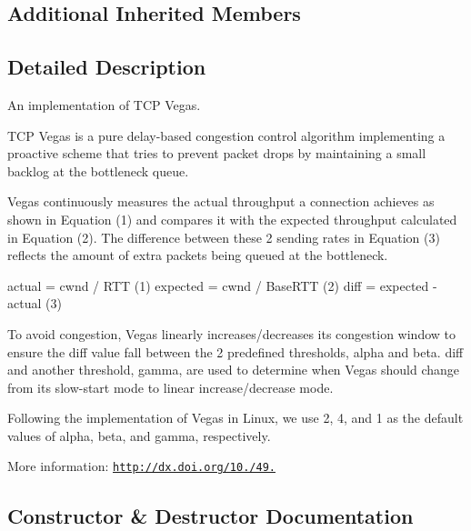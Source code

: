 \subsection*{Additional Inherited Members}


\subsection{Detailed Description}
An implementation of T\+CP Vegas. 

T\+CP Vegas is a pure delay-\/based congestion control algorithm implementing a proactive scheme that tries to prevent packet drops by maintaining a small backlog at the bottleneck queue.

Vegas continuously measures the actual throughput a connection achieves as shown in Equation (1) and compares it with the expected throughput calculated in Equation (2). The difference between these 2 sending rates in Equation (3) reflects the amount of extra packets being queued at the bottleneck. \begin{DoxyVerb}         actual = cwnd / RTT        (1)
         expected = cwnd / BaseRTT  (2)
         diff = expected - actual   (3)
\end{DoxyVerb}


To avoid congestion, Vegas linearly increases/decreases its congestion window to ensure the diff value fall between the 2 predefined thresholds, alpha and beta. diff and another threshold, gamma, are used to determine when Vegas should change from its slow-\/start mode to linear increase/decrease mode.

Following the implementation of Vegas in Linux, we use 2, 4, and 1 as the default values of alpha, beta, and gamma, respectively.

More information\+: \href{http://dx.doi.org/10.1109/49.464716}{\tt http\+://dx.\+doi.\+org/10./49.} 

\subsection{Constructor \& Destructor Documentation}
